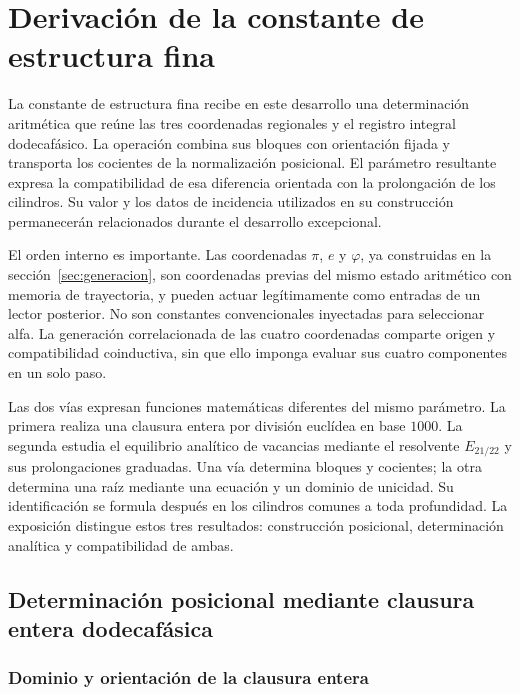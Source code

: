 \section{Derivación de la constante de estructura fina}
\label{sec:alpha}

La constante de estructura fina recibe en este desarrollo una determinación
aritmética que reúne las tres coordenadas regionales y el registro integral
dodecafásico. La operación combina sus bloques con orientación fijada y
transporta los cocientes de la normalización posicional. El parámetro
resultante expresa la compatibilidad de esa diferencia orientada con
la prolongación de los cilindros. Su valor y los datos de incidencia
utilizados en su construcción permanecerán relacionados durante el
desarrollo excepcional.

El orden interno es importante. Las coordenadas \(\pi\),
\(e\) y \(\varphi\), ya construidas en la sección~\ref{sec:generacion}, son coordenadas
previas del mismo estado aritmético con memoria de trayectoria, y pueden actuar legítimamente como
entradas de un lector posterior. No son constantes convencionales
inyectadas para seleccionar alfa. La generación correlacionada de las cuatro coordenadas comparte origen y
compatibilidad coinductiva, sin que ello imponga evaluar sus cuatro
componentes en un solo paso.

Las dos vías expresan funciones matemáticas diferentes del mismo parámetro.
La primera realiza una clausura entera por división euclídea en base
\(1000\). La segunda estudia el equilibrio analítico de vacancias mediante
el resolvente \(E_{21/22}\) y sus prolongaciones graduadas. Una vía
determina bloques y cocientes; la otra determina una raíz mediante una
ecuación y un dominio de unicidad. Su identificación se formula después
en los cilindros comunes a toda profundidad. La exposición distingue
estos tres resultados: construcción posicional, determinación analítica
y compatibilidad de ambas.

\subsection{Determinación posicional mediante clausura entera dodecafásica}
\subsubsection{Dominio y orientación de la clausura entera}
\label{subsec:alpha-dominio}

